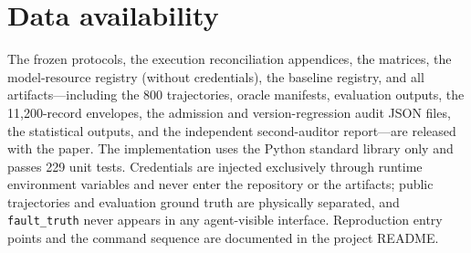 \documentclass[10pt]{article}
\begin{document}
\section*{Data availability}
The frozen protocols, the execution reconciliation appendices, the matrices, the model-resource registry (without credentials), the baseline registry, and all artifacts---including the 800 trajectories, oracle manifests, evaluation outputs, the 11,200-record envelopes, the admission and version-regression audit JSON files, the statistical outputs, and the independent second-auditor report---are released with the paper. The implementation uses the Python standard library only and passes 229 unit tests. Credentials are injected exclusively through runtime environment variables and never enter the repository or the artifacts; public trajectories and evaluation ground truth are physically separated, and \texttt{fault\_truth} never appears in any agent-visible interface. Reproduction entry points and the command sequence are documented in the project README.
\end{document}
